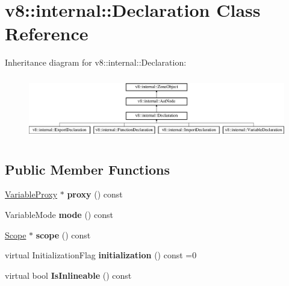 \hypertarget{classv8_1_1internal_1_1_declaration}{}\section{v8\+:\+:internal\+:\+:Declaration Class Reference}
\label{classv8_1_1internal_1_1_declaration}
Inheritance diagram for v8\+:\+:internal\+:\+:Declaration\+:\begin{figure}[H]
\begin{center}
\leavevmode
\includegraphics[height=2.772277cm]{classv8_1_1internal_1_1_declaration}
\end{center}
\end{figure}
\subsection*{Public Member Functions}
\begin{DoxyCompactItemize}
\item 
\hyperlink{classv8_1_1internal_1_1_variable_proxy}{Variable\+Proxy} $\ast$ {\bfseries proxy} () const \hypertarget{classv8_1_1internal_1_1_declaration_ac38c424c7a06cf9b40743b5596ee738a}{}\label{classv8_1_1internal_1_1_declaration_ac38c424c7a06cf9b40743b5596ee738a}

\item 
Variable\+Mode {\bfseries mode} () const \hypertarget{classv8_1_1internal_1_1_declaration_a51759159732384f2d654c3c1127e65aa}{}\label{classv8_1_1internal_1_1_declaration_a51759159732384f2d654c3c1127e65aa}

\item 
\hyperlink{classv8_1_1internal_1_1_scope}{Scope} $\ast$ {\bfseries scope} () const \hypertarget{classv8_1_1internal_1_1_declaration_a28dac848ccf71d6e3dd9392410ebe830}{}\label{classv8_1_1internal_1_1_declaration_a28dac848ccf71d6e3dd9392410ebe830}

\item 
virtual Initialization\+Flag {\bfseries initialization} () const  =0\hypertarget{classv8_1_1internal_1_1_declaration_ae75ef0f59aec3eb1eecba8f7e7ba41d6}{}\label{classv8_1_1internal_1_1_declaration_ae75ef0f59aec3eb1eecba8f7e7ba41d6}

\item 
virtual bool {\bfseries Is\+Inlineable} () const \hypertarget{classv8_1_1internal_1_1_declaration_a3b4b8154ebe29c955b84e28736487973}{}\label{classv8_1_1internal_1_1_declaration_a3b4b8154ebe29c955b84e28736487973}

\end{DoxyCompactItemize}
